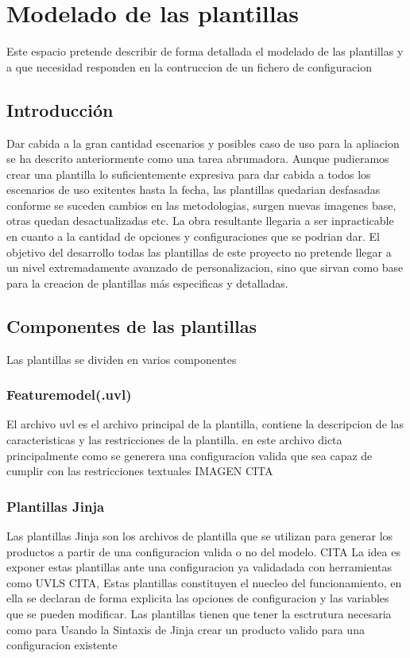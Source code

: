 \documentclass[12pt, a4paper, twoside]{article}
\begin{document}
\section{Modelado de las plantillas}
\label{sec:Modelado de las plantillas}
Este espacio pretende describir de forma detallada el modelado de las plantillas y a que necesidad responden en la contruccion de un fichero de configuracion
\subsection{Introducción}
Dar cabida a la gran cantidad escenarios y posibles caso de uso para la apliacion se ha descrito anteriormente como una tarea abrumadora.
Aunque pudieramos crear una plantilla lo suficientemente expresiva para dar cabida a todos los escenarios de uso exitentes hasta la fecha, las plantillas quedarian desfasadas conforme se suceden cambios 
en las metodologias, surgen nuevas imagenes base, otras quedan desactualizadas etc. La obra resultante llegaria a ser inpracticable en cuanto a la cantidad de opciones y configuraciones que se podrian dar.
El objetivo del desarrollo todas las plantillas de este proyecto no pretende llegar a un nivel extremadamente avanzado de personalizacion, sino que sirvan como base para la creacion de plantillas más especificas y detalladas.

\subsection{Componentes de las plantillas}
Las plantillas se dividen en varios componentes 
\subsubsection{Featuremodel(.uvl)}
El archivo uvl es el archivo principal de la plantilla, contiene la descripcion de las caracteristicas y las restricciones de la plantilla.
en este archivo dicta principalmente como se generera una configuracion valida que sea capaz de cumplir con las restricciones textuales IMAGEN  CITA 
\subsubsection{Plantillas Jinja}
Las plantillas Jinja son los archivos de plantilla que se utilizan para generar los productos a partir de una configuracion valida o no del modelo. CITA
La idea es exponer estas plantillas ante una configuracion ya validadada con herramientas como UVLS CITA, Estas plantillas constituyen el nuecleo del funcionamiento, en ella se declaran de forma explicita las opciones de configuracion y las variables que se pueden modificar.
Las plantillas tienen que tener la esctrutura necesaria como para Usando la Sintaxis de Jinja crear un producto valido para una configuracion existente
\end{document}
